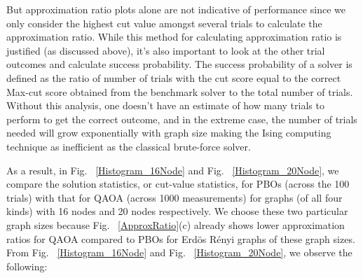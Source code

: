 \documentclass[%
 reprint,
 amsmath,amssymb,
 aps,
]{revtex4-2}
\begin{document}
But approximation ratio plots alone are not indicative of performance since we only consider the highest cut value amongst several trials to calculate the approximation ratio. While this method for calculating approximation ratio is justified (as discussed above), it's also important to look at the other trial outcomes and calculate success probability. The success probability of a solver is defined as the ratio of number of trials with the cut score equal to the correct Max-cut score obtained from the benchmark solver to the total number of trials. Without this analysis, one doesn't have an estimate of how many trials to perform to get the correct outcome, and in the extreme case, the number of trials needed will grow exponentially with graph size making the Ising computing technique as inefficient as the classical brute-force solver. 

As a result, in Fig. ~\ref{Histogram_16Node} and Fig. ~\ref{Histogram_20Node}, we compare the solution statistics, or cut-value statistics, for PBOs (across the 100 trials) with that for QAOA (across 1000 measurements) for graphs (of all four kinds) with 16 nodes and 20 nodes respectively. We choose these two particular graph sizes because Fig. ~\ref{ApproxRatio}(c) already shows lower approximation ratios for QAOA compared to PBOs for Erd{\"o}s R{\'e}nyi graphs of these graph sizes. From Fig. ~\ref{Histogram_16Node} and Fig. ~\ref{Histogram_20Node}, we observe the following:
\end{document}

